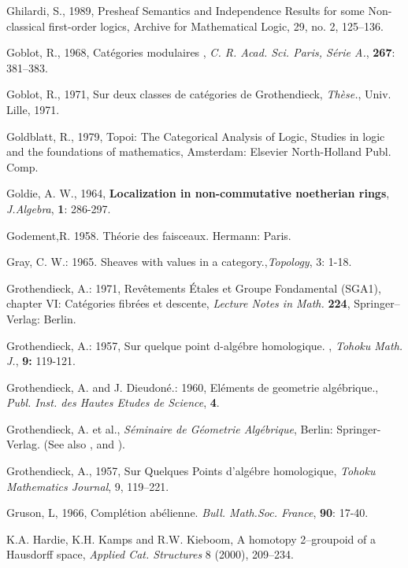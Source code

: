 \documentclass[12pt]{article}
\theoremstyle{plain}
\theoremstyle{definition}
\numberwithin{equation}{section}
\begin{document}
\begin{thebibliography}{9}
Ghilardi, S., 1989, Presheaf Semantics and Independence Results for some Non-classical first-order logics, Archive for Mathematical Logic, 29, no. 2, 125--136. 

Goblot, R., 1968, Cat\'egories modulaires , {\em C. R. Acad. Sci. Paris, S\'erie A.}, \textbf{267}: 381--383.

Goblot, R., 1971, Sur deux classes de cat\'egories de Grothendieck, {\em Th\`ese.}, Univ. Lille, 1971.

Goldblatt, R., 1979, Topoi: The Categorical Analysis of Logic, Studies in logic and the foundations of mathematics, Amsterdam: Elsevier North-Holland Publ. Comp. 

Goldie, A. W., 1964, \textbf{Localization in non-commutative noetherian rings}, {\em J.Algebra}, \textbf{1}: 286-297.

Godement,R. 1958. Th\'{e}orie des faisceaux. Hermann: Paris.

Gray, C. W.: 1965. Sheaves with values in a category.,\emph {Topology}, 3: 1-18.

Grothendieck, A.: 1971, Rev\^{e}tements \'Etales et Groupe Fondamental (SGA1),
chapter VI: Cat\'egories fibr\'ees et descente, \emph{Lecture Notes in Math.}
\textbf{224}, Springer--Verlag: Berlin.

Grothendieck, A.: 1957, Sur quelque point d-alg\'{e}bre homologique. , \emph{Tohoku Math. J.}, \textbf{9:} 119-121.

Grothendieck, A. and J. Dieudon\'{e}.: 1960, El\'{e}ments de geometrie alg\'{e}brique., \emph{Publ. Inst. des Hautes Etudes de Science}, \textbf{4}.

Grothendieck, A. et al., \emph{S\'eminaire de G\'eometrie Alg\'ebrique}, Berlin: Springer-Verlag.
(See also , and ).
  
Grothendieck, A., 1957, Sur Quelques Points d'alg\'ebre homologique, {\em Tohoku Mathematics Journal}, 9, 119--221.
  
Gruson, L, 1966, Compl\'etion ab\'elienne. {\em Bull. Math.Soc. France}, \textbf{90}: 17-40.
 
K.A. Hardie, K.H. Kamps and R.W. Kieboom, A homotopy 2--groupoid of a Hausdorff 
space, {\em Applied Cat. Structures} 8 (2000), 209--234.


\end{thebibliography}
\end{document}
